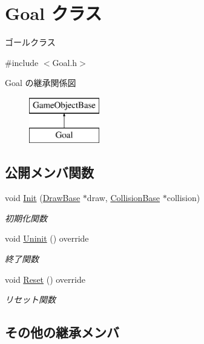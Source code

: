 \hypertarget{class_goal}{}\section{Goal クラス}
\label{class_goal}


ゴールクラス  




{\ttfamily \#include $<$Goal.\+h$>$}

Goal の継承関係図\begin{figure}[H]
\begin{center}
\leavevmode
\includegraphics[height=2.000000cm]{class_goal}
\end{center}
\end{figure}
\subsection*{公開メンバ関数}
\begin{DoxyCompactItemize}
\item 
void \mbox{\hyperlink{class_goal_a694beb5a9164e2bea59fc43affbaa060}{Init}} (\mbox{\hyperlink{class_draw_base}{Draw\+Base}} $\ast$draw, \mbox{\hyperlink{class_collision_base}{Collision\+Base}} $\ast$collision)
\begin{DoxyCompactList}\small\item\em 初期化関数 \end{DoxyCompactList}\item 
void \mbox{\hyperlink{class_goal_a48126385a674bcda855e2a61561fbf9f}{Uninit}} () override
\begin{DoxyCompactList}\small\item\em 終了関数 \end{DoxyCompactList}\item 
void \mbox{\hyperlink{class_goal_a98b797c8012ab43d6fc8c42e4e91466b}{Reset}} () override
\begin{DoxyCompactList}\small\item\em リセット関数 \end{DoxyCompactList}\end{DoxyCompactItemize}
\subsection*{その他の継承メンバ}


